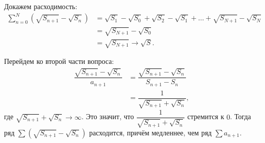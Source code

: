 \documentclass[a4paper, fleqn]{article}
\begin{document}
        Докажем расходимость:
        \begin{align*}
            \sum_{n=0}^{N} (\sqrt{S_{n+1}} - \sqrt{S_n}) 
            &= \sqrt{S_1} - \sqrt{S_0} + \sqrt{S_2} - \sqrt{S_1} + \dots + \sqrt{S_{N+1}} - \sqrt{S_{N}} \\
            &= \sqrt{S_{N+1}} - \sqrt{S_0} \\
            &= \sqrt{S_{N+1}} \to \sqrt{S}.
        \end{align*}

        Перейдем ко второй части вопроса:
        \begin{align*}
            \dfrac{\sqrt{S_{n+1}} - \sqrt{S_n}}{a_{n+1}} 
            &= \dfrac{\sqrt{S_{n+1}} - \sqrt{S_n}}{S_{n+1} - S_n} \\
            &= \dfrac{1}{\sqrt{S_{n+1}} + \sqrt{S_n}},
        \end{align*}
        где $\sqrt{S_{n+1}} + \sqrt{S_n} \to \infty$. Это значит, что $\dfrac{1}{\sqrt{S_{n+1}} + \sqrt{S_n}}$ стремится к $0$. Тогда ряд $\sum (\sqrt{S_{n+1}} - \sqrt{S_n})$ расходится, причём медленнее, чем ряд $\sum a_{n+1}$.
        
\end{document}
